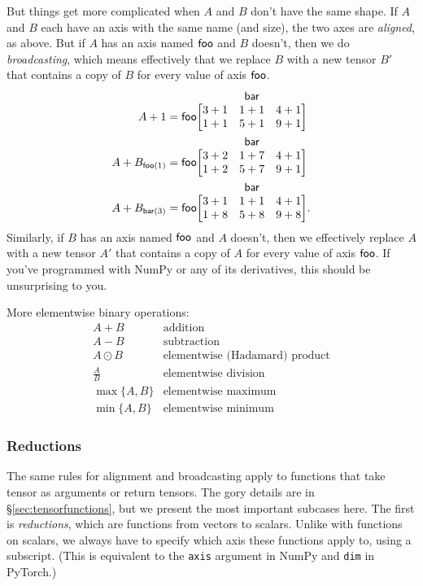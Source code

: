 \documentclass{article}
\makeatletter
\newcommand{\nmatrix}[3]{\name{#1}\begin{array}[b]{@{}c@{}}\name{#2}\\\begin{bmatrix}#3\end{bmatrix}\end{array}}
\makeatother
\begin{document}
But things get more complicated when $A$ and $B$ don't have the same shape. If $A$ and $B$ each have an axis with the same name (and size), the two axes are \emph{aligned}, as above. But if $A$ has an axis named $\mathsf{foo}$ and $B$ doesn't, then we do \emph{broadcasting}, which means effectively that we replace $B$ with a new tensor $B'$ that contains a copy of $B$ for every value of axis $\mathsf{foo}$.
\begin{align*}
A + 1 &= \nmatrix{foo}{bar}{
  3+1 & 1+1 & 4+1 \\
  1+1 & 5+1 & 9+1
} \\
A + B_{\nidx{foo}{1}} &= \nmatrix{foo}{bar}{
  3+2 & 1+7 & 4+1 \\
  1+2 & 5+7 & 9+1
} \\
A + B_{\nidx{bar}{3}} &= \nmatrix{foo}{bar}{
  3+1 & 1+1 & 4+1 \\
  1+8 & 5+8 & 9+8
}.
\end{align*}
Similarly, if $B$ has an axis named $\mathsf{foo}$ and $A$ doesn't, then we effectively replace $A$ with a new tensor $A'$ that contains a copy of $A$ for every value of axis $\mathsf{foo}$. If you've programmed with NumPy or any of its derivatives, this should be unsurprising to you.

More elementwise binary operations:
\[\begin{array}{cl}
A+B & \text{addition} \\
A-B & \text{subtraction} \\
A\odot B & \text{elementwise (Hadamard) product} \\
\displaystyle\frac{A}{B} & \text{elementwise division} \\[1.2ex]
\max \{A, B\} & \text{elementwise maximum} \\
\min \{A, B\} & \text{elementwise minimum}
\end{array}\]

\subsubsection{Reductions}

The same rules for alignment and broadcasting apply to functions that take tensor as arguments or return tensors. The gory details are in \S\ref{sec:tensorfunctions}, but we present the most important subcases here. The first is \emph{reductions}, which are functions from vectors to scalars. Unlike with functions on scalars, we always have to specify which axis these functions apply to, using a subscript. (This is equivalent to the \verb|axis| argument in NumPy and \verb|dim| in PyTorch.)
\end{document}
